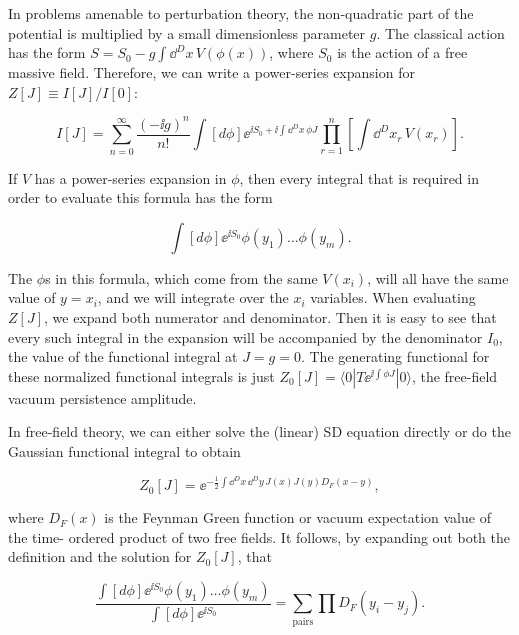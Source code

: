 In problems amenable to perturbation theory, the non-quadratic part of the potential
is multiplied by a small dimensionless parameter $g$. The classical action has the form
$S=S_0-g\int\dd^D x\,V(\phi(x))$, where $S_0$ is the action of a free massive field. Therefore, we can
write a power-series expansion for $Z[J]\equiv I[J]/I[0]$:

\begin{equation}
I[J]=\sum_{n=0}^{\infty}\frac{(-\ii g)^n}{n!}\int[d\phi]\ee^{\ii S_0+\ii\int\dd^D x\,\phi J}\prod_{r=1}^n\left[\int\dd^D x_r\,V(x_r)\right].
\label{eq:3.26}
\end{equation}

If $V$ has a power-series expansion in $\phi$, then every integral that is required in order
to evaluate this formula has the form

\[
\int[d\phi]\ee^{\ii S_0}\phi(y_1)\ldots\phi(y_m).
\]

The $\phi$s in this formula, which come from the same $V(x_i)$, will all have the same value
of $y=x_i$, and we will integrate over the $x_i$ variables. When evaluating $Z[J]$, we expand
both numerator and denominator. Then it is easy to see that every such integral in
the expansion will be accompanied by the denominator $I_0$, the value of the functional
integral at $J=g=0$. The generating functional for these normalized functional
integrals is just $Z_0[J]=\langle0|T\ee^{\ii\int\phi J}|0\rangle$, the free-field vacuum persistence amplitude.

In free-field theory, we can either solve the (linear) SD equation directly or do the
Gaussian functional integral to obtain

\begin{equation}
Z_0[J]=\ee^{-\frac12\int\dd^D x\,\dd^D y\,J(x)J(y)D_F(x-y)},
\label{eq:3.27}
\end{equation}

where $D_F(x)$ is the Feynman Green function or vacuum expectation value of the time-
ordered product of two free fields. It follows, by expanding out both the definition and
the solution for $Z_0[J]$, that

\begin{equation}
\frac{\int[d\phi]\ee^{\ii S_0}\phi(y_1)\ldots\phi(y_m)}{\int[d\phi]\ee^{\ii S_0}}
=\sum_{\text{pairs}}\prod D_F(y_i-y_j).
\label{eq:3.28}
\end{equation}

